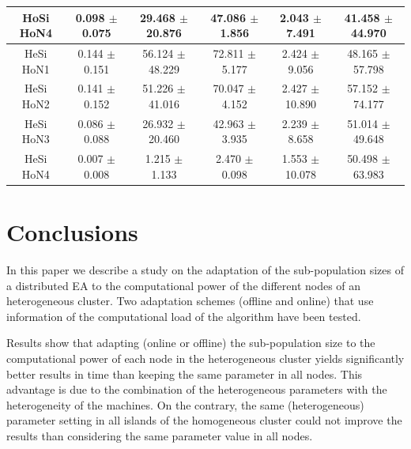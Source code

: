 \documentclass[final,1p,times]{elsarticle}
\begin{document}
\begin{table}[htb]
{\begin{tabular}{|c|c|c|c|c|c|}
HoSi HoN4  &  0.098 $\pm$  0.075  & 29.468 $\pm$ 20.876 & 47.086 $\pm$ 1.856 &  2.043 $\pm$  7.491 &  41.458 $\pm$ 44.970 \\ \hline \hline
HeSi HoN1 &   0.144 $\pm$  0.151 &  56.124 $\pm$ 48.229 & 72.811 $\pm$ 5.177  & 2.424 $\pm$  9.056  & 48.165  $\pm$57.798 \\ \hline
HeSi HoN2 &   0.141 $\pm$  0.152 &  51.226 $\pm$ 41.016 & 70.047 $\pm$ 4.152  & 2.427 $\pm$  10.890 & 57.152  $\pm$74.177 \\ \hline
HeSi HoN3 &   0.086 $\pm$  0.088 &  26.932 $\pm$ 20.460 & 42.963 $\pm$ 3.935  & 2.239 $\pm$  8.658  & 51.014  $\pm$49.648 \\ \hline
HeSi HoN4 &   0.007 $\pm$  0.008 &  1.215  $\pm$ 1.133  & 2.470  $\pm$ 0.098  & 1.553 $\pm$  10.078 & 50.498 $\pm$ 63.983 \\ \hline
\end{tabular}
}
\label{tab:onemaxtimes}
\end{table}

\section{Conclusions}


In this paper we describe a study on the adaptation of the sub-population sizes of a distributed EA to the computational power of the different nodes of an heterogeneous cluster. Two adaptation schemes (offline and online) that use information of the computational load of the algorithm have been tested.

Results show that adapting (online or offline) the sub-population size to the computational power of each node in the heterogeneous cluster yields significantly
better results in time than keeping the same parameter in all nodes. This advantage is due to the combination of the heterogeneous parameters with the heterogeneity of the machines. On the contrary, the same (heterogeneous) parameter setting in all islands of the homogeneous cluster could not improve the results than considering the same parameter value in all nodes.
\end{document}
